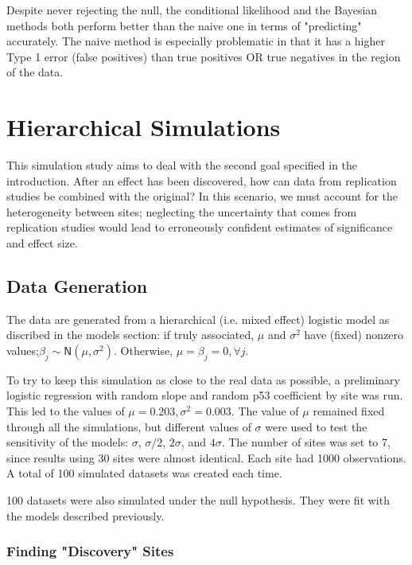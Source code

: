 \documentclass[AMA,STIX1COL]{WileyNJD-v2}\usepackage[]{graphicx}\usepackage[]{color}
\begin{document}
Despite never rejecting the null, the conditional likelihood and the Bayesian methods both perform better than the naive one in terms of "predicting" accurately. The naive method is especially problematic in that it has a higher Type 1 error (false positives) than true positives OR true negatives in the region of the data.

\section{Hierarchical Simulations}\label{sec:hierarchical}





This simulation study aims to deal with the second goal specified in the introduction. After an effect has been discovered, how can data from replication studies be combined with the original? In this scenario, we must account for the heterogeneity between sites; neglecting the uncertainty that comes from replication studies would lead to erroneously confident estimates of significance and effect size.



\subsection{Data Generation}

The data are generated from a hierarchical (i.e. mixed effect) logistic model as discribed in the models section: if truly associated, $\mu$ and $\sigma^2$ have (fixed) nonzero values;$\beta_j \sim \textsf{N}(\mu, \sigma^2)$. Otherwise, $\mu=\beta_j = 0,  \forall j$. 

To try to keep this simulation as close to the real data as possible, a preliminary logistic regression with random slope and random p53 coefficient by site was run. This led to the values of $\mu =0.203, \sigma^2 = 0.003$. The value of $\mu$ remained fixed through all the simulations, but different values of $\sigma$ were used to test the sensitivity of the models: $\sigma$, $\sigma/2$, $2\sigma$, and  $4\sigma$. The number of sites was set to 7, since results using 30 sites were almost identical. Each site had 1000 observations. A total of 100 simulated datasets was created each time.


100 datasets were also simulated under the null hypothesis. They were fit with the models described previously. 

\subsubsection{Finding "Discovery" Sites}
\end{document}
